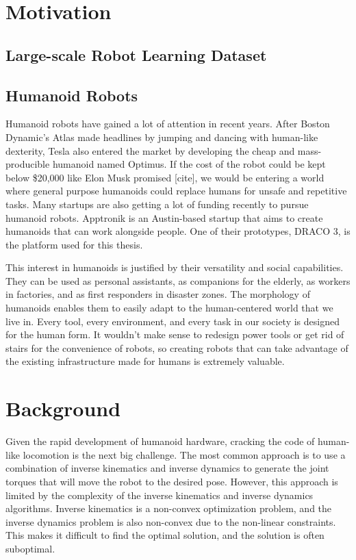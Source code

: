 \section{Motivation}
\subsection{Large-scale Robot Learning Dataset}



\subsection{Humanoid Robots}
Humanoid robots have gained a lot of attention in recent years. After Boston Dynamic's Atlas made headlines by jumping and dancing with human-like dexterity, Tesla also entered the market by developing the cheap and mass-producible humanoid named Optimus. If the cost of the robot could be kept below \$20,000 like Elon Musk promised [cite], we would be entering a world where general purpose humanoids could replace humans for unsafe and repetitive tasks. Many startups are also getting a lot of funding recently to pursue humanoid robots. Apptronik is an Austin-based startup that aims to create humanoids that can work alongside people. One of their prototypes, DRACO 3, is the platform used for this thesis.

This interest in humanoids is justified by their versatility and social capabilities. They can be used as personal assistants, as companions for the elderly, as workers in factories, and as first responders in disaster zones. The morphology of humanoids enables them to easily adapt to the human-centered world that we live in. Every tool, every environment, and every task in our society is designed for the human form. It wouldn't make sense to redesign power tools or get rid of stairs for the convenience of robots, so creating robots that can take advantage of the existing infrastructure made for humans is extremely valuable. 

\section{Background}

Given the rapid development of humanoid hardware, cracking the code of human-like locomotion is the next big challenge. The most common approach is to use a combination of inverse kinematics and inverse dynamics to generate the joint torques that will move the robot to the desired pose. However, this approach is limited by the complexity of the inverse kinematics and inverse dynamics algorithms. Inverse kinematics is a non-convex optimization problem, and the inverse dynamics problem is also non-convex due to the non-linear constraints. This makes it difficult to find the optimal solution, and the solution is often suboptimal.
